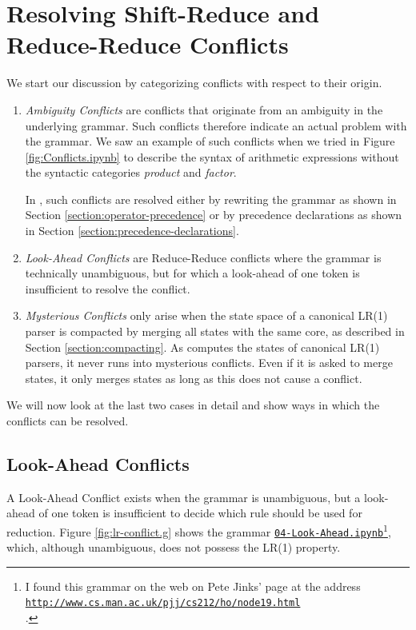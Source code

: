 \section{Resolving Shift-Reduce and Reduce-Reduce Conflicts \label{section:resolving-conflicts}}
We start our discussion by categorizing conflicts with respect to their origin.
\begin{enumerate}
\item \emph{Ambiguity Conflicts} are conflicts that originate from an ambiguity
      in the underlying grammar. Such conflicts therefore indicate an actual
      problem with the grammar. We saw an example of such conflicts when we
      tried in Figure \ref{fig:Conflicts.ipynb}
      to describe the syntax of arithmetic expressions without the syntactic
      categories \textsl{product} and \textsl{factor}.

      In , such conflicts are resolved either by rewriting the grammar as shown in Section
      \ref{section:operator-precedence} or by precedence declarations as shown in Section
      \ref{section:precedence-declarations}.
\item \emph{Look-Ahead Conflicts} are Reduce-Reduce conflicts where the grammar is
      technically unambiguous, but for which a look-ahead of one token is
      insufficient to resolve the conflict.
\item \emph{Mysterious Conflicts} only arise when the state space of a canonical LR(1) parser is compacted by
      merging all states with the same core, as described in Section \ref{section:compacting}.  As
       computes the states of canonical LR(1) parsers, it never
      runs into mysterious conflicts.  Even if it is asked to merge states, it only merges states as long as
      this does not cause a conflict.
\end{enumerate}
We will now look at the last two cases in detail and show ways in which the conflicts can be resolved.

\subsection{Look-Ahead Conflicts}
A Look-Ahead Conflict exists when the grammar is unambiguous, but a look-ahead of one
token is insufficient to decide which rule should be used for reduction. Figure
\ref{fig:lr-conflict.g} shows the grammar
\href{https://github.com/karlstroetmann/Formal-Languages/blob/master/Python/Chapter-11/04-Look-Ahead.ipynb}{\texttt{04-Look-Ahead.ipynb}}\footnote{
I found this grammar on the web on Pete Jinks' page at the address
\\[0.1cm]
\hspace*{1.3cm}
\href{http://www.cs.man.ac.uk/~pjj/cs212/ho/node19.html}{\texttt{http://www.cs.man.ac.uk/pjj/cs212/ho/node19.html}}
\\[0.1cm]
.},
which, although unambiguous, does not possess the LR(1) property.

